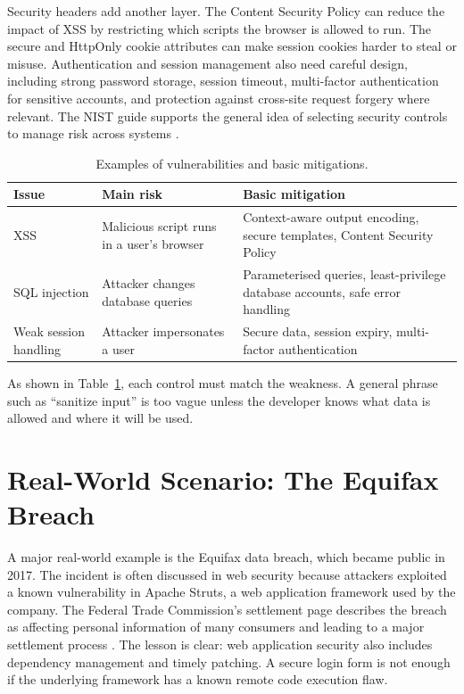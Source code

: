 \documentclass[12pt,a4paper]{article}
\begin{document}
Security headers add another layer. The Content Security Policy can reduce the impact of XSS by restricting which scripts the browser is allowed to run. The secure and HttpOnly cookie attributes can make session cookies harder to steal or misuse. Authentication and session management also need careful design, including strong password storage, session timeout, multi-factor authentication for sensitive accounts, and protection against cross-site request forgery where relevant. The NIST guide supports the general idea of selecting security controls to manage risk across systems \cite{nist80053}.

\begin{table}[h]
\centering
\caption{Examples of vulnerabilities and basic mitigations.}
\label{tab:mitigations}
\begin{tabular}{p{3.2cm}p{5cm}p{5cm}}
\toprule
\textbf{Issue} & \textbf{Main risk} & \textbf{Basic mitigation} \\
\midrule
XSS & Malicious script runs in a user's browser & Context-aware output encoding, secure templates, Content Security Policy \\
SQL injection & Attacker changes database queries & Parameterised queries, least-privilege database accounts, safe error handling \\
Weak session handling & Attacker impersonates a user & Secure data, session expiry, multi-factor authentication \\
\bottomrule
\end{tabular}
\end{table}

As shown in Table~\ref{tab:mitigations}, each control must match the weakness. A general phrase such as ``sanitize input'' is too vague unless the developer knows what data is allowed and where it will be used.

\section{Real-World Scenario: The Equifax Breach}
\label{sec:incident}

A major real-world example is the Equifax data breach, which became public in 2017. The incident is often discussed in web security because attackers exploited a known vulnerability in Apache Struts, a web application framework used by the company. The Federal Trade Commission's settlement page describes the breach as affecting personal information of many consumers and leading to a major settlement process \cite{equifaxFTC}. The lesson is clear: web application security also includes dependency management and timely patching. A secure login form is not enough if the underlying framework has a known remote code execution flaw.
\end{document}
